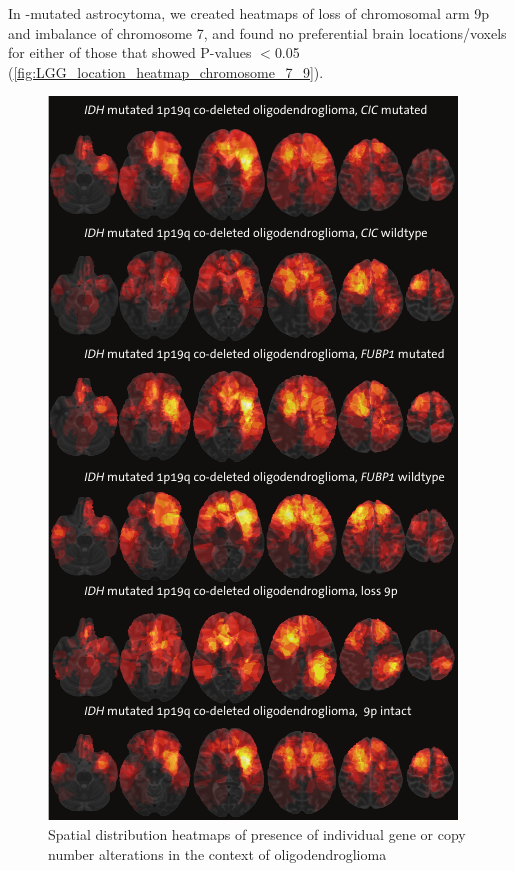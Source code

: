 In -mutated astrocytoma, we created heatmaps of loss of chromosomal arm 9p and imbalance of chromosome 7, and found no preferential brain locations/voxels for either of those that showed P-values $<$0.05 (\cref{fig:LGG_location_heatmap_chromosome_7_9}).

\begin{figure}[htbp]
    \centering
    \includegraphics[height=\textheight]{Figures/heatmap_multi_parameter.png}
    \caption{Spatial distribution heatmaps of presence of individual gene or copy number alterations in the context of oligodendroglioma}\label{fig:LGG_location_heatmap_multi_genetics}
\end{figure}

